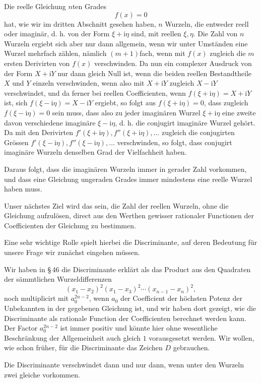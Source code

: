 \documentclass[11pt]{article}
\providecommand{\ii}{\mathrm{i}}
\begin{document}
Die reelle Gleichung $n$ten Grades
\[
        f(x)=0
\]
hat, wie wir im dritten Abschnitt gesehen haben, $n$ Wurzeln, die entweder reell oder imagin\"ar, d. h. von der Form $\xi+\ii\eta$ sind, mit reellen $\xi,\eta$. Die Zahl von $n$ Wurzeln ergiebt sich aber nur dann allgemein, wenn wir unter Umst\"anden eine Wurzel mehrfach z\"ahlen, n\"amlich $(m+1)$fach, wenn mit $f(x)$ zugleich die $m$ ersten Derivirten von $f(x)$ verschwinden. Da nun ein complexer Ausdruck von der Form $X+\ii Y$ nur dann gleich Null ist, wenn die beiden reellen Bestandtheile $X$ und $Y$ einzeln verschwinden, wenn also mit $X+\ii Y$ zugleich $X-\ii Y$ verschwindet, und da ferner bei reellen Coefficienten, wenn $f(\xi+\ii\eta)=X+\ii Y$ ist, sich $f(\xi-\ii\eta)=X-\ii Y$ ergiebt, so folgt aus $f(\xi+\ii\eta)=0$, dass zugleich $f(\xi-\ii\eta)=0$ sein muss, dass also zu jeder imagin\"aren Wurzel $\xi+\ii\eta$ eine zweite davon verschiedene imagin\"are $\xi-\ii\eta$, d. h. die conjugirt imagin\"are Wurzel geh\"ort. Da mit den Derivirten $f'(\xi+\ii\eta), f''(\xi+\ii\eta),\ldots$ zugleich die conjugirten Gr\"ossen $f'(\xi-\ii\eta), f''(\xi-\ii\eta),\ldots$ verschwinden, so folgt, dass conjugirt imagin\"are Wurzeln denselben Grad der Vielfachheit haben.

Daraus folgt, dass die imagin\"aren Wurzeln immer in gerader Zahl vorkommen, und dass eine Gleichung ungeraden Grades immer mindestens eine reelle Wurzel haben muss.

Unser n\"achstes Ziel wird das sein, die Zahl der reellen Wurzeln, ohne die Gleichung aufzul\"osen, direct aus den Werthen gewisser rationaler Functionen der Coefficienten der Gleichung zu bestimmen.

Eine sehr wichtige Rolle spielt hierbei die Discriminante, auf deren Bedeutung f\"ur unsere Frage wir zun\"achst eingehen m\"ussen.

Wir haben in \S\,46 die Discriminante erkl\"art als das Product aus den Quadraten der s\"ammtlichen Wurzeldifferenzen
\[
 (x_1-x_2)^2(x_1-x_3)^2\cdots (x_{n-1}-x_n)^2,
\]
noch multiplicirt mit $a_0^{2n-2}$, wenn $a_0$ der Coefficient der h\"ochsten Potenz der Unbekannten in der gegebenen Gleichung ist, und wir haben dort gezeigt, wie die Discriminante als rationale Function der Coefficienten berechnet werden kann. Der Factor $a_0^{2n-2}$ ist immer positiv und k\"onnte hier ohne wesentliche Beschr\"ankung der Allgemeinheit auch gleich $1$ vorausgesetzt werden. Wir wollen, wie schon fr\"uher, f\"ur die Discriminante das Zeichen $D$ gebrauchen.

Die Discriminante verschwindet dann und nur dann, wenn unter den Wurzeln zwei gleiche vorkommen.
\end{document}
